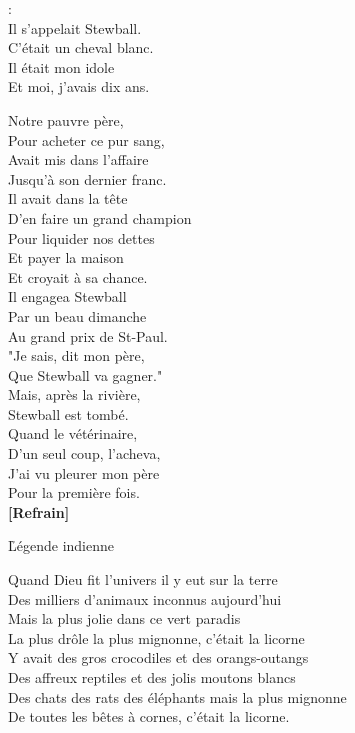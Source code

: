 \documentclass{novel}
\begin{document}
\begin{bfseries}
[Refrain]:\\
Il s'appelait Stewball. \\
C'était un cheval blanc. \\
Il était mon idole \\
Et moi, j'avais dix ans. \\
\end{bfseries}

Notre pauvre père, \\
Pour acheter ce pur sang, \\
Avait mis dans l'affaire \\
Jusqu'à son dernier franc. \\

Il avait dans la tête \\
D'en faire un grand champion \\
Pour liquider nos dettes \\
Et payer la maison \\

Et croyait à sa chance. \\
Il engagea Stewball \\
Par un beau dimanche \\
Au grand prix de St-Paul. \\

"Je sais, dit mon père, \\
Que Stewball va gagner." \\
Mais, après la rivière, \\
Stewball est tombé. \\

Quand le vétérinaire, \\
D'un seul coup, l'acheva, \\
J'ai vu pleurer mon père \\
Pour la première fois. \\

\textbf{[Refrain]}

\newpage
\normalsize
\h*{Légende indienne}

Quand Dieu fit l'univers il y eut sur la terre \\
Des milliers d'animaux inconnus aujourd'hui \\
Mais la plus jolie dans ce vert paradis \\
La plus drôle la plus mignonne, c'était la licorne \\

Y avait des gros crocodiles et des orangs-outangs \\
Des affreux reptiles et des jolis moutons blancs \\
Des chats des rats des éléphants mais la plus mignonne \\
De toutes les bêtes à cornes, c'était la licorne. \\
\end{document}
